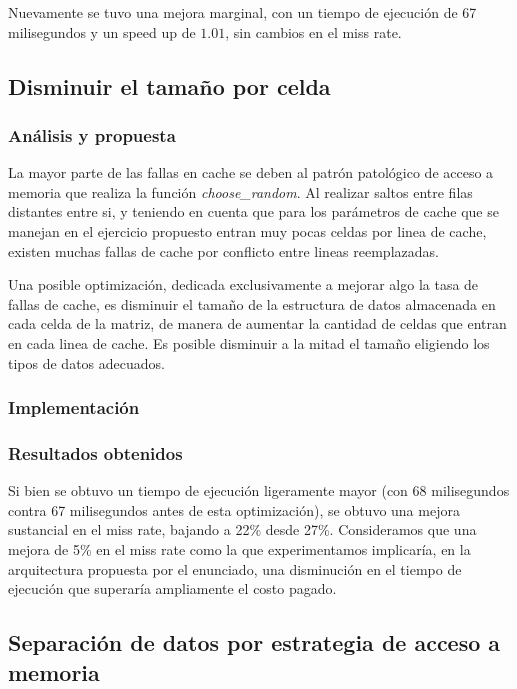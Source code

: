 \documentclass[a4paper,11pt]{article}
\begin{document}
Nuevamente se tuvo una mejora marginal, con un tiempo de ejecución de 67
milisegundos y un speed up de \(1.01\), sin cambios en el miss rate.

\subsection{Disminuir el tamaño por celda}

\subsubsection{Análisis y propuesta}

La mayor parte de las fallas en cache se deben al patrón patológico de acceso a
memoria que realiza la función \textit{choose\_random}. Al realizar saltos
entre filas distantes entre si, y teniendo en cuenta que para los parámetros de
cache que se manejan en el ejercicio propuesto entran muy pocas celdas por
linea de cache, existen muchas fallas de cache por conflicto entre lineas
reemplazadas.

Una posible optimización, dedicada exclusivamente a mejorar algo la tasa de
fallas de cache, es disminuir el tamaño de la estructura de datos almacenada en
cada celda de la matriz, de manera de aumentar la cantidad de celdas que entran
en cada linea de cache. Es posible disminuir a la mitad el tamaño eligiendo los
tipos de datos adecuados.

\subsubsection{Implementación}



\subsubsection{Resultados obtenidos}

Si bien se obtuvo un tiempo de ejecución ligeramente mayor (con 68 milisegundos
contra 67 milisegundos antes de esta optimización), se obtuvo una mejora
sustancial en el miss rate, bajando a 22\% desde 27\%. Consideramos que una
mejora de 5\% en el miss rate como la que experimentamos implicaría, en la
arquitectura propuesta por el enunciado, una disminución en el tiempo de
ejecución que superaría ampliamente el costo pagado.

\subsection{Separación de datos por estrategia de acceso a memoria}
\end{document}
